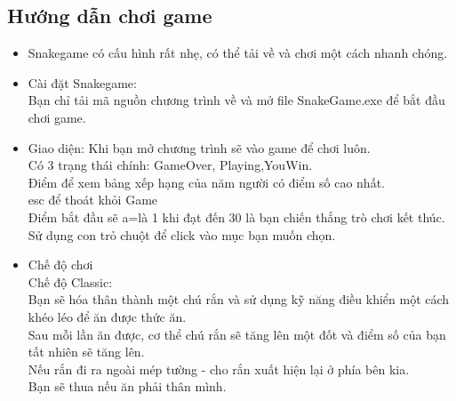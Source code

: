 \documentclass[article]{llncs}
\begin{document}
\subsection{Hướng dẫn chơi game}
    \begin{itemize}
        \item Snakegame có cấu hình rất nhẹ, có thể tải về và chơi một cách nhanh chóng.
    \end{itemize}
    \begin{itemize}
        \item Cài đặt Snakegame:\\
        Bạn chỉ tải mã nguồn chương trình về và mở file SnakeGame.exe để bắt đầu chơi game.
    \end{itemize}
    \begin{itemize}
        \item Giao diện: Khi bạn mở chương trình sẽ vào game để chơi luôn.\\
        Có 3 trạng thái chính: GameOver, Playing,YouWin.\\
        Điểm để xem bảng xếp hạng của năm người có điểm số cao nhất.\\
        esc để thoát khỏi Game\\
        Điểm bắt đầu sẽ a=là 1 khi đạt đến 30 là bạn chiến thắng trò chơi kết thúc.\\
        Sử dụng con trỏ chuột để click vào mục bạn muốn chọn.
    \end{itemize}
    \begin{itemize}
        \item Chế độ chơi\\
        Chế độ Classic:\\
        Bạn sẽ hóa thân thành một chú rắn và sử dụng kỹ năng điều khiển một cách khéo léo để ăn được thức ăn.\\
        Sau mỗi lần ăn được, cơ thể chú rắn sẽ tăng lên một đốt và điểm số của bạn tất nhiên sẽ tăng lên.\\
        Nếu rắn đi ra ngoài mép tường - cho rắn xuất hiện lại ở phía bên kia.\\
        Bạn sẽ thua nếu ăn phải thân mình.\\
    \end{itemize}
    
\end{document}
